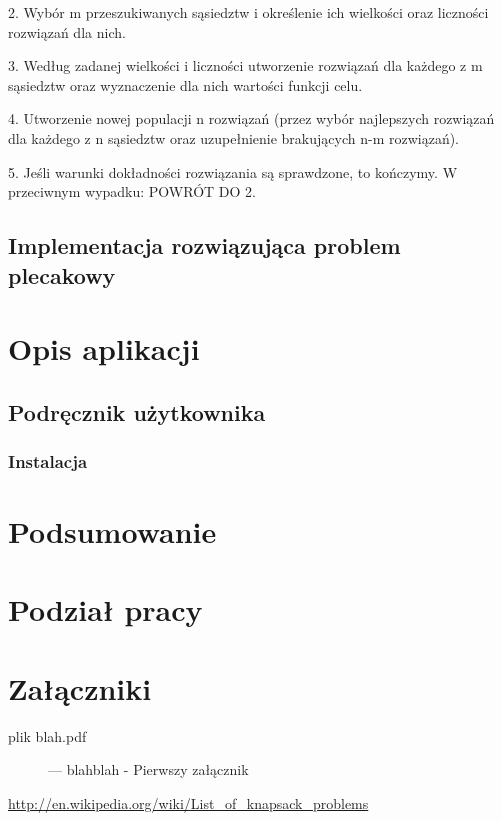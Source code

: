 \documentclass[a4paper,12pt,notitlepage]{mwrep}
\begin{document}
2. Wybór m przeszukiwanych sąsiedztw i określenie ich wielkości oraz liczności rozwiązań dla nich.

3. Według zadanej wielkości i liczności utworzenie rozwiązań dla każdego z m sąsiedztw oraz wyznaczenie dla nich wartości funkcji celu.

4. Utworzenie nowej populacji n rozwiązań (przez wybór najlepszych rozwiązań dla każdego z n sąsiedztw oraz uzupełnienie brakujących n-m rozwiązań).

5. Jeśli warunki dokładności rozwiązania są sprawdzone, to kończymy. W przeciwnym wypadku: POWRÓT DO 2.


\section{Implementacja rozwiązująca problem plecakowy}

\chapter{Opis aplikacji}
\section{Podręcznik użytkownika}
\subsection{Instalacja}

\chapter{Podsumowanie}

\chapter{Podział pracy}

\addtocounter{page}{-1}

\appendix
\chapter*{Załączniki}
\begin{description}
	\item[plik blah.pdf]	 --- blahblah - Pierwszy załącznik
\end{description}

\begin{thebibliography}{9}

	\href{http://en.wikipedia.org/wiki/List_of_knapsack_problems}{http://en.wikipedia.org/wiki/List\_of\_knapsack\_problems}

\end{thebibliography}


\listoffigures

\listoftables

\label{LastPage}
\end{document}
